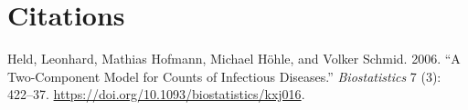 \documentclass[]{article}
\numberwithin{equation}{section}
\begin{document}
\hypertarget{citations}{%
\section*{Citations}\label{citations}}

\hypertarget{refs}{}
\leavevmode\hypertarget{ref-held_two-component_2006}{}%
Held, Leonhard, Mathias Hofmann, Michael Höhle, and Volker Schmid. 2006.
``A Two-Component Model for Counts of Infectious Diseases.''
\emph{Biostatistics} 7 (3): 422--37.
\url{https://doi.org/10.1093/biostatistics/kxj016}.
\end{document}
